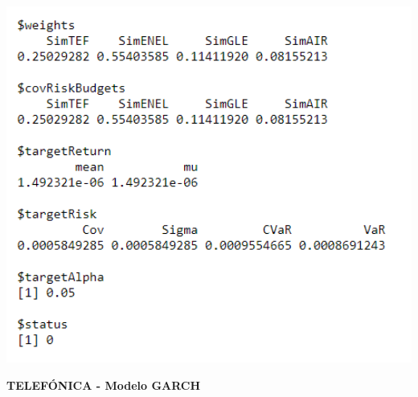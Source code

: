 \documentclass[
  12pt,
  a4paper,
  openany]{book}
\theoremstyle{definition}
\theoremstyle{definition}
\theoremstyle{definition}
\theoremstyle{remark}
\begin{document}
\begin{center}
\begin{minipage}{0.90\linewidth}
    \centering
    \includegraphics[width=2\textwidth]{image/ewmaport.png}
\end{minipage}
\end{center}

\newpage

\begin{center}
 {\normalfont\Large\bfseries TELEFÓNICA - Modelo GARCH}
\end{center}
\end{document}
